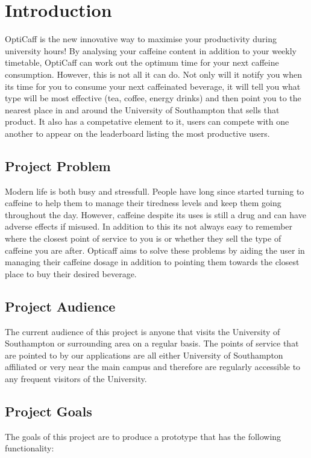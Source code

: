 \section{Introduction}

OptiCaff is the new innovative way to maximise your productivity during university hours! By analysing your caffeine content in addition to your weekly timetable, OptiCaff can work out the optimum time for your next caffeine consumption. However, this is not all it can do. Not only will it notify you when its time for you to consume your next caffeinated beverage, it will tell you what type will be most effective (tea, coffee, energy drinks) and then point you to the nearest place in and around the University of Southampton that sells that product. It also has a competative element to it, users can compete with one another to appear on the leaderboard listing the most productive users. 

\subsection{Project Problem}
Modern life is both busy and stressfull. People have long since started turning to caffeine to help them to manage their tiredness levels and keep them going throughout the day. However, caffeine despite its uses is still a drug and can have adverse effects if misused. In addition to this its not always easy to remember where the closest point of service to you is or whether they sell the type of caffeine you are after. Opticaff aims to solve these problems by aiding the user in managing their caffeine dosage in addition to pointing them towards the closest place to buy their desired beverage. 

\subsection{Project Audience}
The current audience of this project is anyone that visits the University of Southampton or surrounding area on a regular basis. The points of service that are pointed to by our applications are all either University of Southampton affiliated or very near the main campus and therefore are regularly accessible to any frequent visitors of the University. 

\subsection{Project Goals}
The goals of this project are to produce a prototype that has the following functionality: 

